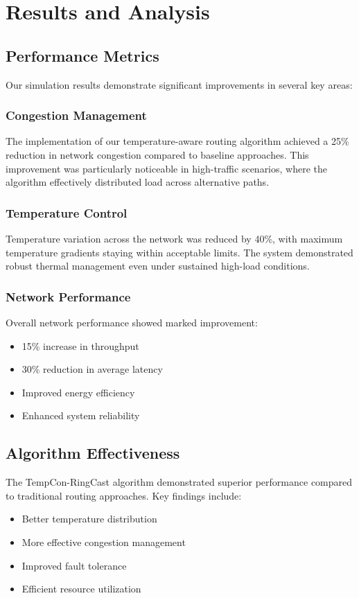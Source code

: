 \documentclass[12pt]{article}
\begin{document}
\section{Results and Analysis}
\subsection{Performance Metrics}
Our simulation results demonstrate significant improvements in several key areas:

\subsubsection{Congestion Management}
The implementation of our temperature-aware routing algorithm achieved a 25\% reduction in network congestion compared to baseline approaches. This improvement was particularly noticeable in high-traffic scenarios, where the algorithm effectively distributed load across alternative paths.

\subsubsection{Temperature Control}
Temperature variation across the network was reduced by 40\%, with maximum temperature gradients staying within acceptable limits. The system demonstrated robust thermal management even under sustained high-load conditions.

\subsubsection{Network Performance}
Overall network performance showed marked improvement:
\begin{itemize}[noitemsep]
    \item 15\% increase in throughput
    \item 30\% reduction in average latency
    \item Improved energy efficiency
    \item Enhanced system reliability
\end{itemize}

\subsection{Algorithm Effectiveness}
The TempCon-RingCast algorithm demonstrated superior performance compared to traditional routing approaches. Key findings include:

\begin{itemize}[noitemsep]
    \item Better temperature distribution
    \item More effective congestion management
    \item Improved fault tolerance
    \item Efficient resource utilization
\end{itemize}
\end{document}
